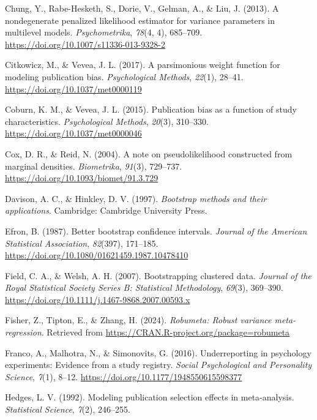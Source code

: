 \documentclass[
  american,
  man, donotrepeattitle,floatsintext]{apa7}
\newlength{\cslhangindent}
\newenvironment{CSLReferences}[2] %
 {\begin{list}{}{%
  \setlength{\itemindent}{0pt}
  \setlength{\leftmargin}{0pt}
  \setlength{\parsep}{0pt}
  \ifodd #1
   \setlength{\leftmargin}{\cslhangindent}
   \setlength{\itemindent}{-1\cslhangindent}
  \fi
  \setlength{\itemsep}{#2\baselineskip}}}
 {\end{list}}
\begin{document}
\begin{CSLReferences}{1}{0}
Chung, Y., Rabe-Hesketh, S., Dorie, V., Gelman, A., \& Liu, J. (2013). A nondegenerate penalized likelihood estimator for variance parameters in multilevel models. \emph{Psychometrika}, \emph{78}(4, 4), 685--709. \url{https://doi.org/10.1007/s11336-013-9328-2}

Citkowicz, M., \& Vevea, J. L. (2017). {A parsimonious weight function for modeling publication bias}. \emph{Psychological Methods}, \emph{22}(1), 28--41. \url{https://doi.org/10.1037/met0000119}

Coburn, K. M., \& Vevea, J. L. (2015). Publication bias as a function of study characteristics. \emph{Psychological Methods}, \emph{20}(3), 310--330. \url{https://doi.org/10.1037/met0000046}

Cox, D. R., \& Reid, N. (2004). A note on pseudolikelihood constructed from marginal densities. \emph{Biometrika}, \emph{91}(3), 729--737. \url{https://doi.org/10.1093/biomet/91.3.729}

Davison, A. C., \& Hinkley, D. V. (1997). \emph{Bootstrap methods and their applications}. Cambridge: Cambridge University Press.

Efron, B. (1987). Better bootstrap confidence intervals. \emph{Journal of the American Statistical Association}, \emph{82}(397), 171--185. \url{https://doi.org/10.1080/01621459.1987.10478410}

Field, C. A., \& Welsh, A. H. (2007). Bootstrapping clustered data. \emph{Journal of the Royal Statistical Society Series B: Statistical Methodology}, \emph{69}(3), 369--390. \url{https://doi.org/10.1111/j.1467-9868.2007.00593.x}

Fisher, Z., Tipton, E., \& Zhang, H. (2024). \emph{Robumeta: Robust variance meta-regression}. Retrieved from \url{https://CRAN.R-project.org/package=robumeta}

Franco, A., Malhotra, N., \& Simonovits, G. (2016). Underreporting in psychology experiments: Evidence from a study registry. \emph{Social Psychological and Personality Science}, \emph{7}(1), 8--12. \url{https://doi.org/10.1177/1948550615598377}

Hedges, L. V. (1992). Modeling publication selection effects in meta-analysis. \emph{Statistical Science}, \emph{7}(2), 246--255.


\end{CSLReferences}
\end{document}
